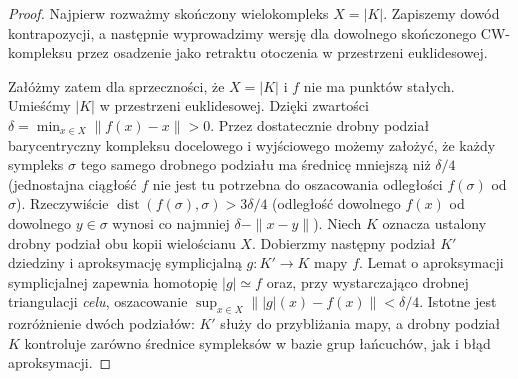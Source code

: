 \documentclass[11pt,a4paper,oneside]{report}
\theoremstyle{plain}
\theoremstyle{definition}
\theoremstyle{remark}
\begin{document}
\begin{proof}
Najpierw rozważmy skończony wielokompleks $X=|K|$.
Zapiszemy dowód kontrapozycji, a następnie wyprowadzimy
wersję dla dowolnego skończonego CW-kompleksu przez
osadzenie jako retraktu otoczenia w przestrzeni euklidesowej.

Załóżmy zatem dla sprzeczności, że $X=|K|$ i $f$
nie ma punktów stałych. Umieśćmy $|K|$ w przestrzeni
euklidesowej. Dzięki zwartości
$\delta=\min_{x\in X}\|f(x)-x\|>0$.
Przez dostatecznie drobny podział barycentryczny
kompleksu docelowego i wyjściowego możemy założyć,
że każdy sympleks $\sigma$ tego samego drobnego podziału
ma średnicę mniejszą niż $\delta/4$ (jednostajna
ciągłość $f$ nie jest tu potrzebna do oszacowania odległości
$f(\sigma)$ od $\sigma$). Rzeczywiście
$\operatorname{dist}(f(\sigma),\sigma)>3\delta/4$
(odległość dowolnego $f(x)$ od dowolnego $y\in\sigma$
wynosi co najmniej $\delta-\|x-y\|$).
Niech $K$ oznacza ustalony drobny podział obu kopii
wielościanu $X$. Dobierzmy następny podział $K'$ dziedziny
i aproksymację symplicjalną $g:K'\to K$ mapy $f$.
Lemat o aproksymacji symplicjalnej zapewnia homotopię
$|g|\simeq f$ oraz, przy wystarczająco drobnej triangulacji
\emph{celu}, oszacowanie
$\sup_{x\in X}\||g|(x)-f(x)\|<\delta/4$.
Istotne jest rozróżnienie dwóch podziałów: $K'$ służy
do przybliżania mapy, a drobny podział $K$ kontroluje
zarówno średnice sympleksów w bazie grup łańcuchów,
jak i błąd aproksymacji.


\end{proof}
\end{document}
